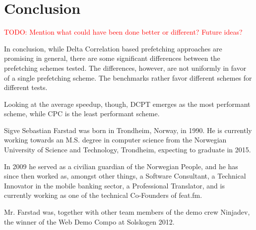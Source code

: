 \documentclass[a4paper]{IEEEtran}
\newcommand\TODO[1]{\textcolor{red}{TODO:#1}}
\newcommand\todo[1]{\TODO{#1}}
\begin{document}


\section{Conclusion}

\todo{ Mention what could have been done better or different? Future ideas? }

In conclusion, while Delta Correlation based prefetching approaches are promising in general, there are some significant differences between the prefetching schemes tested.
The differences, however, are not uniformly in favor of a single prefetching scheme.
The benchmarks rather favor different schemes for different tests.

Looking at the average speedup, though, DCPT emerges as the most performant scheme, while CPC is the least performant scheme.





\nocite{*}

\begin{IEEEbiography}{Sigve Sebastian Farstad}
    was born in Trondheim, Norway, in 1990.
    He is currently working towards an M.S. degree in computer science from the Norwegian University of Science and Technology, Trondheim, expecting to graduate in 2015.

    In 2009 he served as a civilian guardian of the Norwegian People, and he has since then worked as, amongst other things, a Software Consultant, a Technical Innovator in the mobile banking sector, a Professional Translator, and is currently working as one of the technical Co-Founders of feat.fm.

    Mr. Farstad was, together with other team members of the demo crew Ninjadev, the winner of the Web Demo Compo at Solskogen 2012.
\end{IEEEbiography}
\end{document}
